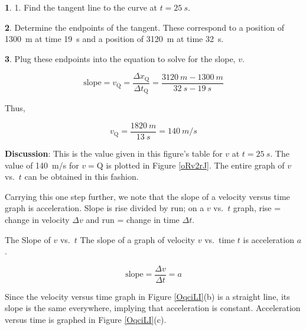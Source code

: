 \documentclass[../../main-ap-physics.tex]{subfiles}
\begin{document}
\vspace{1em}

\textbf{1}. 1. Find the tangent line to the curve at $t = \SI{25}{s}$.

\vspace{1em}

\textbf{2}. Determine the endpoints of the tangent. These correspond to a position of \SI{1300}{m} at time \SI{19}{s} and a position of \SI{3120}{m} at time \SI{32}{s}.

\vspace{1em}

\textbf{3}. Plug these endpoints into the equation to solve for the slope, $v$.

\begin{equation*}
    \text{slope} = v_{\text{Q}} = \frac{\Delta x_{\text{Q}}}{\Delta t_{\text{Q}}} = \frac{\SI{3120}{m} - \SI{1300}{m}}{\SI{32}{s} - \SI{19}{s}}
\end{equation*}

Thus,

\begin{equation*}
    v_{\text{Q}} = \frac{\SI{1820}{m}}{\SI{13}{s}} = \SI{140}{m/s}
\end{equation*}

\textbf{Discussion}: This is the value given in this figure's table for $v$ at  $t = \SI{25}{s}$. The value of \SI{140}{m/s} for $v={\text{Q}}$ is plotted in Figure \ref{oRv2rJ}. The entire graph of $v$ vs.~$t$ can be obtained in this fashion.

\vspace{1ex}

\endsolution

\vspace{1em}

Carrying this one step further, we note that the slope of a velocity versus time graph is acceleration. Slope is rise divided by run; on a $v$ vs.~$t$ graph, rise = change in velocity $\Delta v$ and run = change in time $\Delta t$.

\begin{gradient}{The Slope of $v$ vs.~$t$}
    The slope of a graph of velocity $v$ vs.~time $t$ is acceleration $a$.

    \begin{equation*}
        \text{slope} = \frac{\Delta v}{\Delta t} = a
    \end{equation*}
\end{gradient}

Since the velocity versus time graph in Figure \ref{OqciLI}(b) is a straight line, its slope is the same everywhere, implying that acceleration is constant. Acceleration versus time is graphed in Figure \ref{OqciLI}(c).
\end{document}
